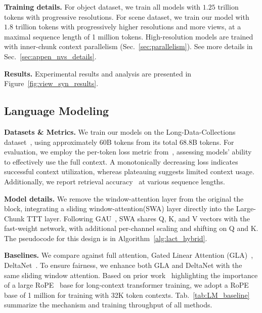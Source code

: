 \noindent\textbf{Training details.}
For object dataset, we train all models with $1.25$ trillion tokens with progressive resolutions.  For scene dataset, we train our model with $1.8$ trillion tokens with progressively higher resolutions and more views, at a maximal sequence length of 1 million tokens.  High-resolution models are trained with inner-chunk context parallelism (Sec.~\ref{sec:parallelism}). See more details in Sec.~\ref{sec:appen_nvs_details}.  


\noindent\textbf{Results.}
Experimental results and analysis are presented in Figure~\ref{fig:view_syn_results}.


 
\subsection{Language Modeling}\label{sec:exp_language}

\noindent\textbf{Datasets \& Metrics.}
We train our models on the Long-Data-Collections dataset~\cite{long_data_collection}, using approximately 60B tokens from its total 68.8B tokens. For evaluation, we employ the per-token loss metric from~\cite{linforgetting}, assessing models' ability to effectively use the full context. A monotonically decreasing loss indicates successful context utilization, whereas plateauing suggests limited context usage. Additionally, we report retrieval accuracy~\cite{hsiehruler} at various sequence lengths.



\noindent\textbf{Model details.} We remove the window-attention layer from the original the \methodname{} block, integrating a sliding window-attention(SWA) layer directly into the Large-Chunk TTT layer. Following GAU~\cite{hua2022transformer}, SWA shares Q, K, and V vectors with the fast-weight network, with additional per-channel scaling and shifting on Q and K. 
The pseudocode for this design is in Algorithm~\ref{alg:lact_hybrid}.

\noindent\textbf{Baselines.}
We compare against full attention, Gated Linear Attention (GLA)~\cite{yang2024gated}, DeltaNet~\cite{schlag2021linear,yangparallelizing}. To ensure fairness, we enhance both GLA and DeltaNet with the same sliding window attention. Based on prior work~\cite{linforgetting, xiong2023effective, men2024base} highlighting the importance of a large RoPE~\cite{su2023roformer} base for long-context transformer training,  we adopt a RoPE base of 1 million for training with 32K token contexts.
Tab.~\ref{tab:LM_baseline} summarize the mechanism and training throughput of all methods. 

